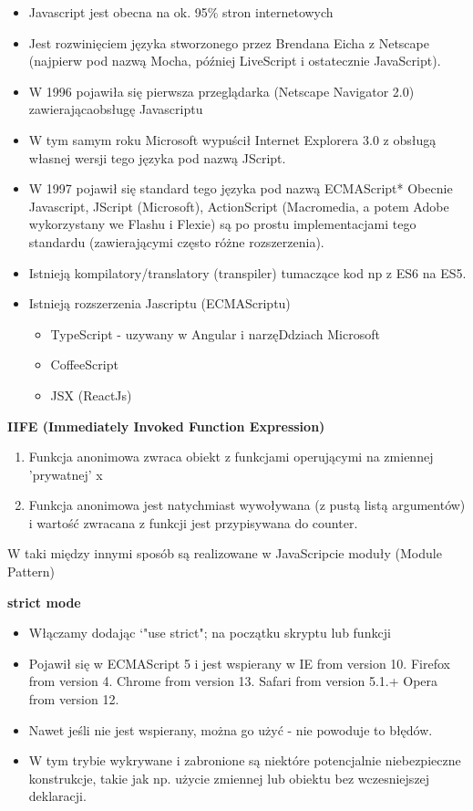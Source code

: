 \documentclass[../main.tex]{subfiles}
\begin{document}
    \begin{itemize}
        \item Javascript jest obecna na ok. 95\% stron internetowych
        \item Jest rozwinięciem języka stworzonego przez Brendana Eicha z Netscape (najpierw pod nazwą Mocha, później LiveScript i ostatecznie JavaScript).
        \item W 1996 pojawiła się pierwsza przeglądarka (Netscape Navigator 2.0) zawierającaobsługę Javascriptu
        \item W tym samym roku Microsoft wypuścił Internet Explorera 3.0 z obsługą własnej wersji tego języka pod nazwą JScript.
        \item W 1997 pojawił się standard tego języka pod nazwą ECMAScript* Obecnie Javascript, JScript (Microsoft), ActionScript (Macromedia, a potem Adobe wykorzystany we Flashu i Flexie) są po prostu implementacjami tego standardu (zawierającymi często różne rozszerzenia).
        \item Istnieją kompilatory/translatory (transpiler) tumaczące kod np z ES6 na ES5.
        \item Istnieją rozszerzenia Jascriptu (ECMAScriptu)
        \begin{itemize}
            \item TypeScript - uzywany w Angular i narzęDdziach Microsoft
            \item CoffeeScript
            \item JSX (ReactJs)
        \end{itemize}
    \end{itemize}

    \textbf{IIFE (Immediately Invoked Function Expression)}
    \begin{enumerate}
        \item Funkcja anonimowa zwraca obiekt z funkcjami operującymi na zmiennej 'prywatnej' x
        \item Funkcja anonimowa jest natychmiast wywoływana (z pustą listą argumentów) i wartość zwracana z funkcji jest przypisywana do counter.
    \end{enumerate}
    W taki między innymi sposób są realizowane w JavaScripcie moduły (Module Pattern)


    \textbf{strict mode}
    \begin{itemize}
        \item Włączamy dodając `"use strict"; na początku skryptu lub funkcji
        \item Pojawił się w ECMAScript 5 i jest wspierany w IE from version 10. Firefox from version 4.
        Chrome from version 13. Safari from version 5.1.+ Opera from version 12.
        \item Nawet jeśli nie jest wspierany, można go użyć - nie powoduje to błędów.
        \item W tym trybie wykrywane i zabronione są niektóre potencjalnie niebezpieczne konstrukcje, takie jak np. użycie zmiennej lub obiektu bez wczesniejszej deklaracji.
    \end{itemize}
\end{document}
